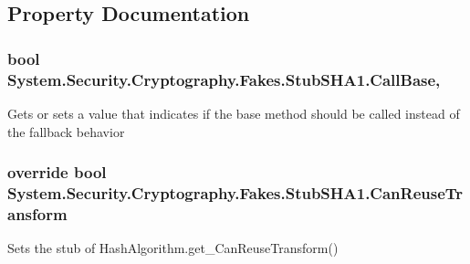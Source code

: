\subsection{Property Documentation}
\hypertarget{class_system_1_1_security_1_1_cryptography_1_1_fakes_1_1_stub_s_h_a1_ab07fe371af6885e3f1c03b014020f901}{
\subsubsection[{Call\-Base}]{\setlength{\rightskip}{0pt plus 5cm}bool System.\-Security.\-Cryptography.\-Fakes.\-Stub\-S\-H\-A1.\-Call\-Base\hspace{0.3cm}{\ttfamily [get]}, {\ttfamily [set]}}}\label{class_system_1_1_security_1_1_cryptography_1_1_fakes_1_1_stub_s_h_a1_ab07fe371af6885e3f1c03b014020f901}


Gets or sets a value that indicates if the base method should be called instead of the fallback behavior

\hypertarget{class_system_1_1_security_1_1_cryptography_1_1_fakes_1_1_stub_s_h_a1_af920937d88e1f488288cc4e6f459f500}{
\subsubsection[{Can\-Reuse\-Transform}]{\setlength{\rightskip}{0pt plus 5cm}override bool System.\-Security.\-Cryptography.\-Fakes.\-Stub\-S\-H\-A1.\-Can\-Reuse\-Transform\hspace{0.3cm}{\ttfamily [get]}}}\label{class_system_1_1_security_1_1_cryptography_1_1_fakes_1_1_stub_s_h_a1_af920937d88e1f488288cc4e6f459f500}


Sets the stub of Hash\-Algorithm.\-get\-\_\-\-Can\-Reuse\-Transform()

